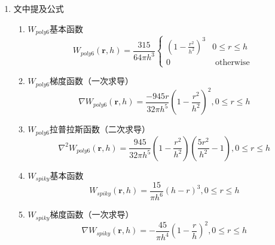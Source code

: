 \documentclass[printMode=false, declarePage=true]{ecnuthesis}
\begin{document}
\mainmatter

% 
% 



\backmatter

\PrintReference

\begin{appendix}
  \begin{enumerate}
    \item 文中提及公式\label{formula}
    \begin{enumerate}
        \item $W_{poly6}$基本函数
            \begin{equation}
                W_{poly6}(\mathbf{r},h) = \frac{315}{64\pi h^3} \begin{cases}
             (1-\frac{r^2}{h^2})^3 & 0 \le r \le h\\
             0 & \text{ otherwise } 
            \end{cases}\label{con:poly6_1}
            \end{equation}
        \item $W_{poly6}$梯度函数（一次求导）
            \begin{equation}
                \nabla W_{poly6}(\mathbf{r},h) = \frac{-945r}{32\pi h^5} (1-\frac{r^2}{h^2})^2,0\le r \le h 
                \label{con:poly6_2}
            \end{equation}
        \item $W_{poly6}$拉普拉斯函数（二次求导）
            \begin{equation}
                \nabla^2 W_{poly6}(\mathbf{r},h) = \frac{945}{32\pi h^5} (1-\frac{r^2}{h^2})(\frac{5r^2}{h^2}-1 ),0\le r \le h 
                \label{con:poly6_3}
            \end{equation}
        \item $W_{spiky}$基本函数
            \begin{equation}
                W_{spiky}(\mathbf{r},h) = \frac{15}{\pi h^6} (h-r)^3,0\le r \le h 
                \label{con:spiky_1}
            \end{equation}
        \item $W_{spiky}$梯度函数（一次求导）
            \begin{equation}
                \nabla W_{spiky}(\mathbf{r},h) = - \frac{45}{\pi h^4} (1-\frac{r}{h})^2,0\le r \le h 
                \label{con:spiky_2}
            \end{equation}

\end{enumerate}
\end{enumerate}
\end{appendix}
\end{document}
